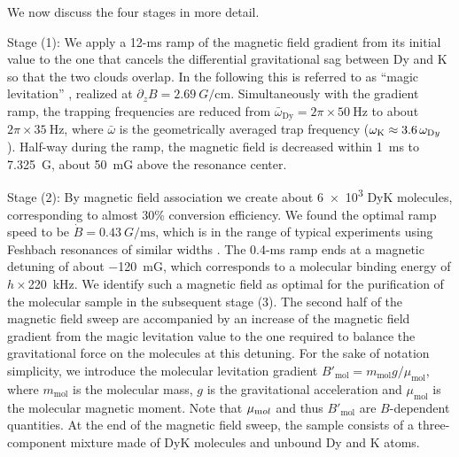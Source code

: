 We now discuss the four stages in more detail. 

Stage (1): We apply a 12-ms ramp of the magnetic field gradient from its initial value to the one that cancels the differential gravitational sag between Dy and K so that the two clouds overlap. In the following this is referred to as ``magic levitation'' \cite{Lous2017toa},  realized at $\partial_z B=\SI{2.69}{ G/\centi\meter}$. Simultaneously with the gradient ramp, the trapping frequencies are reduced from $\bar{\omega}_{\mathrm{Dy}}=2\pi\times\SI{50}{\hertz}$ to about $2\pi\times\SI{35}{\hertz}$, where $\bar\omega$ is the geometrically averaged trap frequency ($\omega_{\textrm K}\approx 3.6\,\omega_{\textrm Dy}$ \cite{Ravensbergen2018ado}).
Half-way during the ramp, the magnetic field is decreased within \SI{1}{\milli\second} to \SI{7.325}{ G}, about \SI{+50}{\milli G} above the resonance center. 

Stage (2): By magnetic field association \cite{Koehler2006poc, Chin2010fri} we create about \SI{6e3}{} DyK molecules, corresponding to almost 30\%  conversion efficiency. We found the optimal ramp speed to be $\dot{B}=\SI{0.43}{ G/\milli\second}$, which is in the range of typical experiments using Feshbach resonances of similar widths \cite{Chin2010fri}. The 0.4-ms ramp ends at a magnetic detuning of about \SI{-120}{\milli G}, which corresponds to a molecular binding energy of $h\times$\SI{220}{\kilo\hertz}. We identify such a magnetic field as optimal for the purification of the molecular sample in the subsequent stage (3). The second half of the magnetic field sweep are accompanied by an increase of the magnetic field gradient from the magic levitation value to the one required to balance the gravitational force on the molecules at this detuning. For the sake of notation simplicity, we introduce the {molecular levitation gradient} ${B'}_{\textrm{mol}}=m_{\mathrm{mol}}g/\mu_{\mathrm{mol}}$, where $m_{\mathrm{mol}}$ is the molecular mass, $g$ is the gravitational acceleration and $\mu_{\mathrm{mol}}$ is the molecular magnetic moment. Note that $\mu_{\textrm mol}$ and thus ${B'}_{\textrm{mol}}$ are $B$-dependent quantities. At the end of the magnetic field sweep, the sample consists of a three-component mixture made of DyK molecules and unbound Dy and K atoms.

